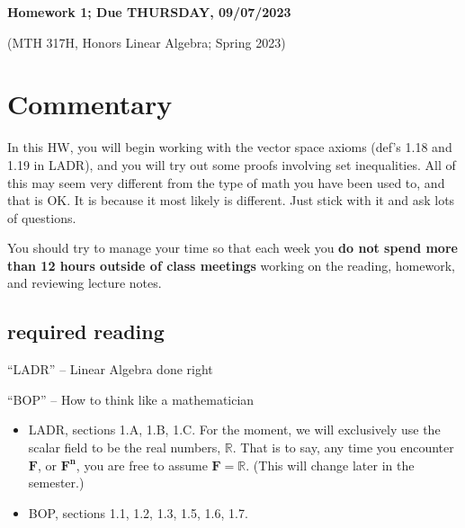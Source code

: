 \documentclass[12pt]{article}
\def\real{{\mathbb R}}
\begin{document}
	\begin{LARGE}
	\begin{center}
		
	
		
		
		
	\textbf{Homework 1; Due THURSDAY, 09/07/2023}
	

	(MTH 317H, Honors Linear Algebra;  Spring 2023)
	\end{center}
	\end{LARGE}
	\vspace{0.15in}
	
	
	
	
\section{Commentary}

In this HW, you will begin working with the vector space axioms (def's 1.18 and 1.19 in LADR), and you will try out some proofs involving set inequalities.  All of this may seem very different from the type of math you have been used to, and that is OK.  It is because it most likely is different.  Just stick with it and ask lots of questions.

You should try to manage your time so that each week you \textbf{do not spend more than 12 hours outside of class meetings} working on the reading, homework, and reviewing lecture notes.




\subsection{required reading}

``LADR'' -- Linear Algebra done right

\noindent
``BOP'' -- How to think like a mathematician

\begin{itemize}
	\item LADR, sections 1.A, 1.B, 1.C.  For the moment, we will exclusively use the scalar field to be the real numbers, $\real$.  That is to say, any time you encounter $\mathbf{F}$, or $\mathbf{F^n}$, you are free to assume $\mathbf{F}=\real$.  (This will change later in the semester.)
	
	\item BOP, sections 1.1, 1.2, 1.3, 1.5, 1.6, 1.7.
\end{itemize}
\end{document}
